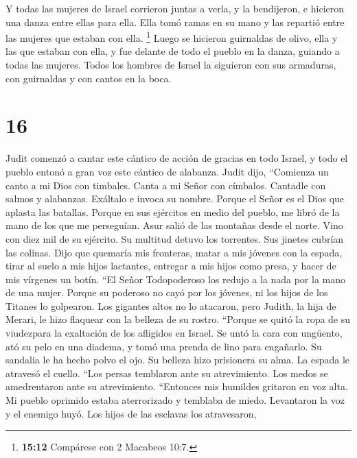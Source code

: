  Y todas las mujeres de Israel corrieron juntas a verla,
y la bendijeron, e hicieron una danza entre ellas para ella. Ella tomó
ramas en su mano y las repartió entre las mujeres que estaban con ella.
\footnote{\textbf{15:12} Compárese con 2 Macabeos 10:7.} 
Luego se hicieron guirnaldas de olivo, ella y las que estaban con ella,
y fue delante de todo el pueblo en la danza, guiando a todas las
mujeres. Todos los hombres de Israel la siguieron con sus armaduras, con
guirnaldas y con cantos en la boca.

\hypertarget{section-15}{%
\section{16}\label{section-15}}

 Judit comenzó a cantar este cántico de acción de gracias
en todo Israel, y todo el pueblo entonó a gran voz este cántico de
alabanza.  Judit dijo, ``Comienza un canto a mi Dios con
timbales. Canta a mi Señor con címbalos. Cantadle con salmos y
alabanzas. Exáltalo e invoca su nombre.  Porque el Señor
es el Dios que aplasta las batallas. Porque en sus ejércitos en medio
del pueblo, me libró de la mano de los que me perseguían. 
Asur salió de las montañas desde el norte. Vino con diez mil de su
ejército. Su multitud detuvo los torrentes. Sus jinetes cubrían las
colinas.  Dijo que quemaría mis fronteras, matar a mis
jóvenes con la espada, tirar al suelo a mis hijos lactantes, entregar a
mis hijos como presa, y hacer de mis vírgenes un botín. 
``El Señor Todopoderoso los redujo a la nada por la mano de una mujer.
 Porque su poderoso no cayó por los jóvenes, ni los hijos
de los Titanes lo golpearon. Los gigantes altos no lo atacaron, pero
Judith, la hija de Merari, le hizo flaquear con la belleza de su rostro.
 ``Porque se quitó la ropa de su viudezpara la exaltación
de los afligidos en Israel. Se untó la cara con ungüento, ató su pelo en
una diadema, y tomó una prenda de lino para engañarlo.  Su
sandalia le ha hecho polvo el ojo. Su belleza hizo prisionera su alma.
La espada le atravesó el cuello.  ``Los persas temblaron
ante su atrevimiento. Los medos se amedrentaron ante su atrevimiento.
 ``Entonces mis humildes gritaron en voz alta. Mi pueblo
oprimido estaba aterrorizado y temblaba de miedo. Levantaron la voz y el
enemigo huyó.  Los hijos de las esclavas los atravesaron,
